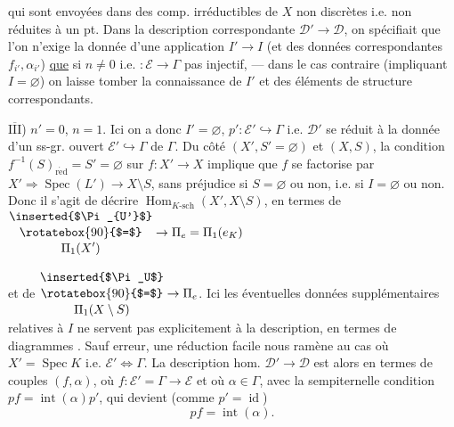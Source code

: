 
qui sont envoyées dans des comp. irréductibles de $X$  non discrètes i.e. non réduites à un pt.
Dans la description correspondante $\mathcal D'\to\mathcal D$, on spécifiait que l'on n'exige la donnée d'une application $I'\to I$ (et des données correspondantes $f_{i'},\alpha_{i'}$) \uline{que} si  $n\ne0$ i.e. $:\mathcal E\to\Gamma$ pas injectif, --- dans le cas contraire (impliquant $I=\varnothing$)  on laisse tomber la connaissance de $I'$ et des éléments de structure correspondants.

\uline{$\overline{\mathrm{III}}$}) $n'=0$, $n=1$. Ici on a donc $I'=\varnothing$, $p':\mathcal E'\hookrightarrow\Gamma$ i.e. $\mathcal D'$ se réduit à la donnée d'un ss-gr. ouvert $\mathcal E'\hookrightarrow\Gamma$ de $\Gamma$.
Du côté $(X',S'=\varnothing)$ et $(X,S)$, la condition $f^{-1}(S)_{\mathrm{r\acute ed}}=S'=\varnothing$ sur  $f:X'\to X$ implique que $f$ se factorise par $X'\Longrightarrow\operatorname{Spec}(L')\longrightarrow X\setminus S$, sans préjudice si $S=\varnothing$ ou non, i.e. si $I=\varnothing$ ou non. Donc il s'agit de décrire $\operatorname{Hom}_{K\text{-sch}}(X',X\setminus S)$, en termes de $\begin{gathered}\text{\inserted{$\Pi_{U'}$}}\\[-2pt]\rotatebox{90}{$=$}\\[-2pt]\Pi_1(X')\end{gathered}\to\Pi_e=\Pi_1(e_K)$



et de $\begin{gathered}\text{\inserted{$\Pi_U$}}\\[-2pt]\rotatebox{90}{$=$}\\[-2pt]\Pi_1(X\setminus S)\end{gathered}\to\Pi_e$.
Ici les éventuelles données supplémentaires relatives à $I$ ne servent pas explicitement à la description, en termes de diagrammes .
Sauf erreur, une réduction facile  nous ramène au cas où $X'=\operatorname{Spec}K$ i.e. $\mathcal E'\Leftrightarrow\Gamma$. La description  hom. $\mathcal D'\to\mathcal D$ est alors  en termes de couples $(f,\alpha)$, où $f:\mathcal E'=\Gamma\to\mathcal E$ et où $\alpha\in\Gamma$, avec la sempiternelle condition $pf=\operatorname{int}(\alpha)p'$, qui devient (comme $p'=\operatorname{id}$)
\[
 pf=\operatorname{int}(\alpha).
\]

